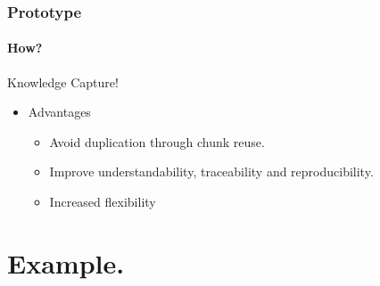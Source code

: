 \documentclass{beamer}
\begin{document}


\begin{frame}

\frametitle{Prototype}
\framesubtitle{How?}

Knowledge Capture!

\begin{itemize}
\item Advantages
\begin{itemize}
\item Avoid duplication through chunk reuse.
\item Improve understandability, traceability and reproducibility.
\item Increased flexibility
\end{itemize}
\end{itemize}
\end{frame}


\section[Example]{Example.}

\end{document}
